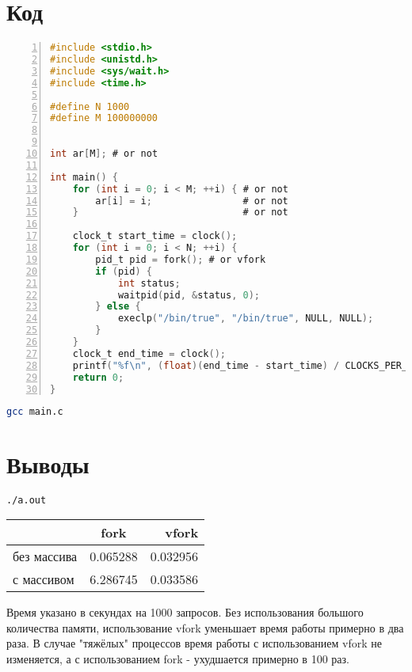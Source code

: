 \documentclass[12pt]{article}
\begin{document}
\section{Код}
\begin{lstlisting}[language=C,frame=single,numbers=left]
#include <stdio.h>
#include <unistd.h>
#include <sys/wait.h>
#include <time.h>

#define N 1000
#define M 100000000


int ar[M]; # or not

int main() {
    for (int i = 0; i < M; ++i) { # or not
        ar[i] = i;                # or not
    }                             # or not

    clock_t start_time = clock();
    for (int i = 0; i < N; ++i) {
        pid_t pid = fork(); # or vfork
        if (pid) {
            int status;
            waitpid(pid, &status, 0);
        } else {
            execlp("/bin/true", "/bin/true", NULL, NULL);
        }
    }
    clock_t end_time = clock();
    printf("%f\n", (float)(end_time - start_time) / CLOCKS_PER_SEC);
    return 0;
}
\end{lstlisting}
\begin{lstlisting}[language=bash]
gcc main.c
\end{lstlisting}
\section{Выводы}
\begin{lstlisting}[language=bash]
./a.out
\end{lstlisting}
\begin{center}
  \begin{tabular}{ | l | c | r | }
    \hline
     & fork & vfork \\ \hline
    без массива & 0.065288 & 0.032956 \\ \hline
    с массивом & 6.286745 & 0.033586 \\
    \hline
  \end{tabular}
\end{center}
Время указано в секундах на 1000 запросов. Без использования большого количества памяти, использование vfork уменьшает время работы примерно в два раза. В случае "тяжёлых" процессов время работы с использованием vfork не изменяется, а с использованием fork - ухудшается примерно в 100 раз.
\end{document}
